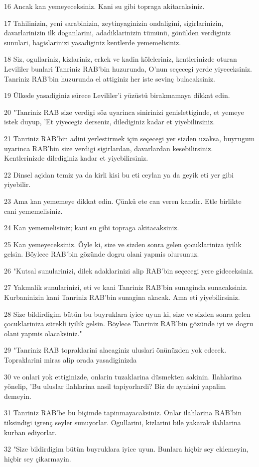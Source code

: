 \par 16 Ancak kan yemeyeceksiniz. Kani su gibi topraga akitacaksiniz.
\par 17 Tahilinizin, yeni sarabinizin, zeytinyaginizin ondaligini, sigirlarinizin, davarlarinizin ilk doganlarini, adadiklarinizin tümünü, gönülden verdiginiz sunulari, bagislarinizi yasadiginiz kentlerde yememelisiniz.
\par 18 Siz, ogullariniz, kizlariniz, erkek ve kadin köleleriniz, kentlerinizde oturan Levililer bunlari Tanriniz RAB'bin huzurunda, O'nun seçecegi yerde yiyeceksiniz. Tanriniz RAB'bin huzurunda el attiginiz her iste sevinç bulacaksiniz.
\par 19 Ülkede yasadiginiz sürece Levililer'i yüzüstü birakmamaya dikkat edin.
\par 20 "Tanriniz RAB size verdigi söz uyarinca sinirinizi genislettiginde, et yemeye istek duyup, 'Et yiyecegiz derseniz, dilediginiz kadar et yiyebilirsiniz.
\par 21 Tanriniz RAB'bin adini yerlestirmek için seçecegi yer sizden uzaksa, buyrugum uyarinca RAB'bin size verdigi sigirlardan, davarlardan kesebilirsiniz. Kentlerinizde dilediginiz kadar et yiyebilirsiniz.
\par 22 Dinsel açidan temiz ya da kirli kisi bu eti ceylan ya da geyik eti yer gibi yiyebilir.
\par 23 Ama kan yememeye dikkat edin. Çünkü ete can veren kandir. Etle birlikte cani yememelisiniz.
\par 24 Kan yememelisiniz; kani su gibi topraga akitacaksiniz.
\par 25 Kan yemeyeceksiniz. Öyle ki, size ve sizden sonra gelen çocuklariniza iyilik gelsin. Böylece RAB'bin gözünde dogru olani yapmis olursunuz.
\par 26 "Kutsal sunularinizi, dilek adaklarinizi alip RAB'bin seçecegi yere gideceksiniz.
\par 27 Yakmalik sunularinizi, eti ve kani Tanriniz RAB'bin sunaginda sunacaksiniz. Kurbaninizin kani Tanriniz RAB'bin sunagina akacak. Ama eti yiyebilirsiniz.
\par 28 Size bildirdigim bütün bu buyruklara iyice uyun ki, size ve sizden sonra gelen çocuklariniza sürekli iyilik gelsin. Böylece Tanriniz RAB'bin gözünde iyi ve dogru olani yapmis olacaksiniz."
\par 29 "Tanriniz RAB topraklarini alacaginiz uluslari önünüzden yok edecek. Topraklarini miras alip orada yasadiginizda
\par 30 ve onlari yok ettiginizde, onlarin tuzaklarina düsmekten sakinin. Ilahlarina yönelip, 'Bu uluslar ilahlarina nasil tapiyorlardi? Biz de aynisini yapalim demeyin.
\par 31 Tanriniz RAB'be bu biçimde tapinmayacaksiniz. Onlar ilahlarina RAB'bin tiksindigi igrenç seyler sunuyorlar. Ogullarini, kizlarini bile yakarak ilahlarina kurban ediyorlar.
\par 32 "Size bildirdigim bütün buyruklara iyice uyun. Bunlara hiçbir sey eklemeyin, hiçbir sey çikarmayin.

